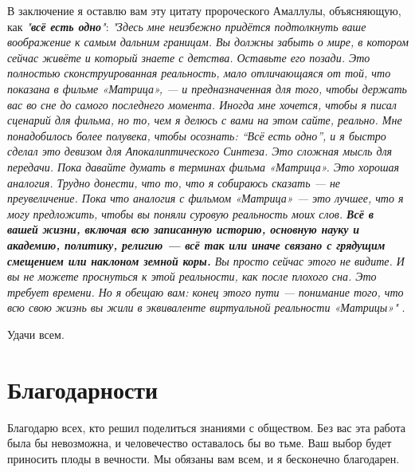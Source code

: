 \documentclass[10pt,twocolumn,letterpaper]{article}
\begin{document}
В заключение я оставлю вам эту цитату пророческого Амаллулы, объясняющую, как \textit{"\textbf{всё есть одно}"}: \textit{"Здесь мне неизбежно придётся подтолкнуть ваше воображение к самым дальним границам. Вы должны забыть о мире, в котором сейчас живёте и который знаете с детства. Оставьте его позади. Это полностью сконструированная реальность, мало отличающаяся от той, что показана в фильме «Матрица», — и предназначенная для того, чтобы держать вас во сне до самого последнего момента. Иногда мне хочется, чтобы я писал сценарий для фильма, но то, чем я делюсь с вами на этом сайте, реально. Мне понадобилось более полувека, чтобы осознать: “Всё есть одно”, и я быстро сделал это девизом для Апокалиптического Синтеза. Это сложная мысль для передачи. Пока давайте думать в терминах фильма «Матрица». Это хорошая аналогия. Трудно донести, что то, что я собираюсь сказать — не преувеличение. Пока что аналогия с фильмом «Матрица» — это лучшее, что я могу предложить, чтобы вы поняли суровую реальность моих слов. \textbf{Всё в вашей жизни, включая всю записанную историю, основную науку и академию, политику, религию — всё так или иначе связано с грядущим смещением или наклоном земной коры.} Вы просто сейчас этого не видите. И вы не можете проснуться к этой реальности, как после плохого сна. Это требует времени. Но я обещаю вам: конец этого пути — понимание того, что всю свою жизнь вы жили в эквиваленте виртуальной реальности «Матрицы»"} \cite{33,34}.

Удачи всем.
\section{Благодарности}

Благодарю всех, кто решил поделиться знаниями с обществом. Без вас эта работа была бы невозможна, и человечество оставалось бы во тьме. Ваш выбор будет приносить плоды в вечности. Мы обязаны вам всем, и я бесконечно благодарен.

\clearpage
\twocolumn

{\small
\renewcommand{\refname}{Ссылки}


}
\end{document}
